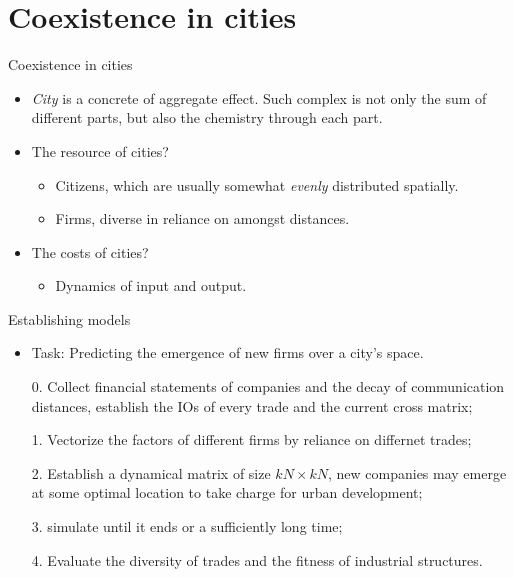 \documentclass{beamer}
\begin{document}
\section{Coexistence in cities}

\begin{frame}{Coexistence in cities}
    \begin{itemize}
        \item \emph{City} is a concrete of aggregate effect. Such complex is not only the sum of different parts, but also the chemistry through each part.
        \vspace{0.5cm}
        \item The resource of cities?
        \begin{itemize}
            \item Citizens, which are usually somewhat \emph{evenly} distributed spatially.
            \item Firms, diverse in reliance on amongst distances.
        \end{itemize}
        \item The costs of cities?
        \begin{itemize}
            \item Dynamics of input and output.
        \end{itemize}
    \end{itemize}
\end{frame}

\begin{frame}{Establishing models}
    \begin{itemize}
        \item Task: Predicting the emergence of new firms over a city's space.
        \item[0.] Collect financial statements of companies and the decay of communication distances, establish the IOs of every trade and the current cross matrix;
        \item[1.] Vectorize the factors of different firms by reliance on differnet trades;
        \item[2.] Establish a dynamical matrix of size $kN\times kN$, new companies may emerge at some optimal location to take charge for urban development;
        \item[3.] simulate until it ends or a sufficiently long time;
        \item[4.] Evaluate the diversity of trades and the fitness of industrial structures.
    \end{itemize}
\end{frame}
\end{document}
